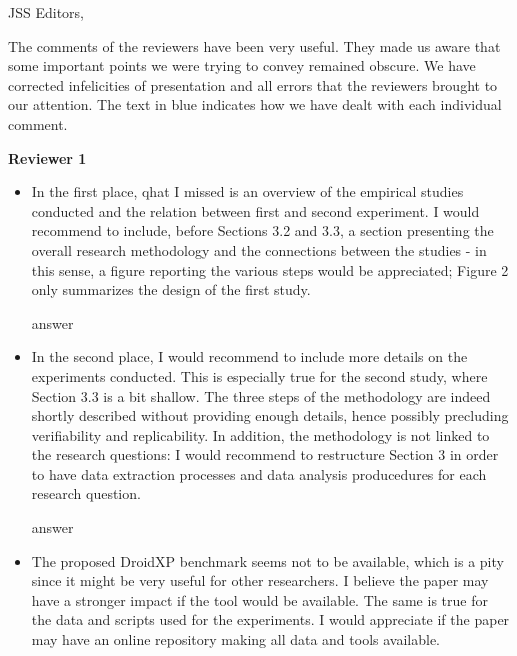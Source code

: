 \documentclass{letter}
\begin{document}
\begin{letter}{JSS Editors,}
\opening{The comments of the reviewers have been very useful. They made us aware that some important points we were trying to convey remained obscure. We have corrected infelicities of presentation and all errors that the reviewers brought to our attention. The text in {\color{blue}blue} indicates how we have dealt with each individual comment.}


{\bf Reviewer 1}

\begin{itemize}
\item In the first place, qhat I missed is an overview of the empirical studies conducted and the relation between 
first and second experiment. I would recommend to include, before Sections 3.2 and 3.3, a section 
presenting the overall research methodology and the connections between the studies - in this sense, 
a figure reporting the various steps would be appreciated; Figure 2 only summarizes the design of the first study.


\vspace{0.2cm}
  
{\color{blue}{\bf Answer:} answer}

\vspace{0.2cm}

\item In the second place, I would recommend to include more details on the experiments conducted. This is especially 
true for the second study, where Section 3.3 is a bit shallow. The three steps of the methodology are indeed shortly 
described without providing enough details, hence possibly precluding verifiability and replicability. In addition, the 
methodology is not linked to the research questions: I would recommend to restructure Section 3 in order to have 
data extraction processes and data analysis producedures for each research question.


\vspace{0.2cm}

{\color{blue}{\bf Answer:} answer}  

\vspace{0.2cm}

\item The proposed DroidXP benchmark seems not to be available, which is a pity since it might be very useful for other 
researchers. I believe the paper may have a stronger impact if the tool would be available. The same is true for the 
data and scripts used for the experiments. I would appreciate if the paper may have an online repository making all 
data and tools available.



\end{itemize}
\end{letter}
\end{document}
